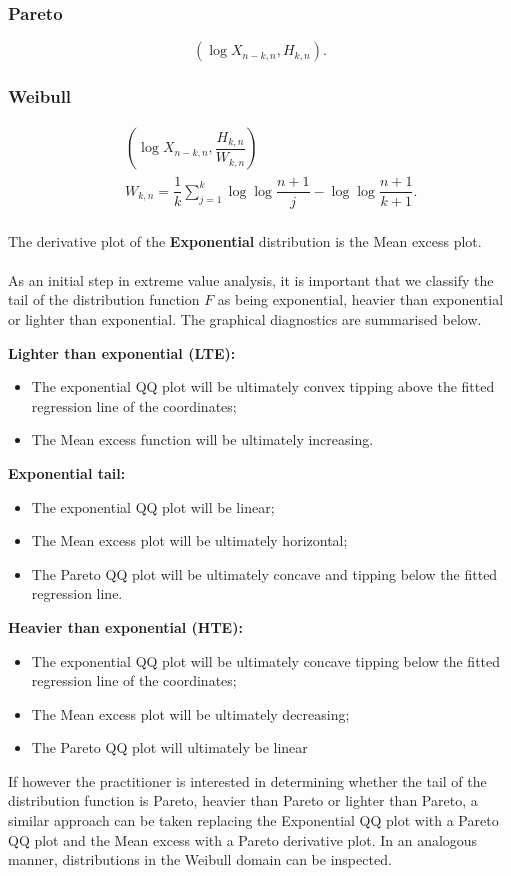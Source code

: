 \subsubsection*{Pareto}
\begin{equation*}
\left(\log X_{n-k,n}, H_{k,n}\right).
\end{equation*}

\subsubsection*{Weibull}
\begin{eqnarray*}
&&\left(\log X_{n-k,n}, \dfrac{H_{k,n}}{W_{k,n}} \right)\\
&&W_{k,n}=\dfrac{1}{k}\sum^k_{j=1}\log\log\dfrac{n+1}{j}-\log\log\dfrac{n+1}{k+1}.\\
\end{eqnarray*}

The derivative plot of the \textbf{Exponential} distribution is the Mean excess plot.
\\\\
As an initial step in extreme value analysis, it is important that we classify the tail of the distribution function $F$ as being exponential, heavier than exponential or lighter than exponential. The graphical diagnostics are summarised below.

\textbf{Lighter than exponential (LTE):}
\begin{itemize}
\item The exponential QQ plot will be ultimately convex tipping above the fitted regression line of the coordinates;
\item The Mean excess function will be ultimately increasing.
\end{itemize}

\textbf{Exponential tail:}
\begin{itemize}
\item The exponential QQ plot will be linear;
\item The Mean excess plot will be ultimately horizontal;
\item The Pareto QQ plot will be ultimately concave and tipping below the fitted regression line.
\end{itemize}

\textbf{Heavier than exponential (HTE):}
\begin{itemize}
\item The exponential QQ plot will be ultimately concave tipping below the fitted regression line of the coordinates;
\item The Mean excess plot will be ultimately decreasing;
\item The Pareto QQ plot will ultimately be linear
\end{itemize}
If however the practitioner is interested in determining whether the tail of the distribution function is Pareto, heavier than Pareto or lighter than Pareto, a similar approach can be taken replacing the Exponential QQ plot with a Pareto QQ plot and the Mean excess with a Pareto derivative plot. In an analogous manner, distributions in the Weibull domain can be inspected.

